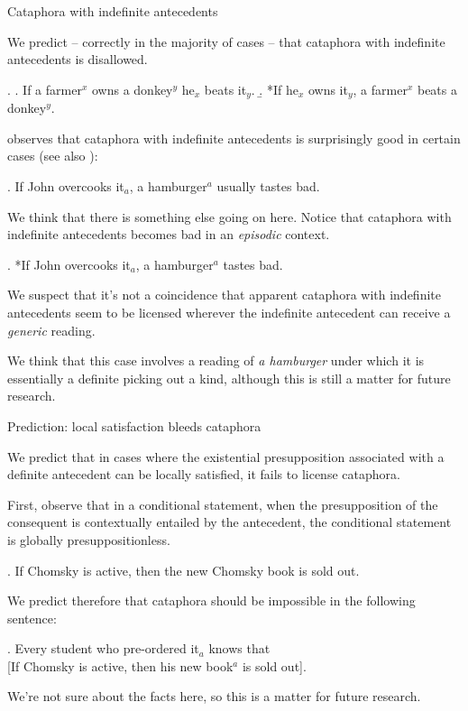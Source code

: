 \documentclass{beamer}
\begin{document}
\begin{frame}[allowframebreaks]{Cataphora with indefinite antecedents}

  We predict -- correctly in the majority of cases -- that cataphora with indefinite antecedents is disallowed.

  \exi.
  \a. If a farmer\(^{x}\) owns a donkey\(^{y}\) he\(_{x}\) beats it\(_{y}\).
  \b. *If he\(_{x}\) owns it\(_{y}\), a farmer\(^{x}\) beats a donkey\(^{y}\).

  \framebreak

  \citet[p.\,192]{chierchia_dynamics_1995} observes that cataphora with indefinite antecedents is surprisingly good in certain cases (see also \citealt{barkerShan2008}):

  \ex. If John overcooks it\(_{a}\), a hamburger\(^{a}\) usually tastes bad.

  \framebreak

  We think that there is something else going on here. Notice that cataphora with indefinite antecedents becomes bad in an \textit{episodic} context.

  \ex. *If John overcooks it\(_{a}\), a hamburger\(^{a}\) tastes bad.

  We suspect that it's not a coincidence that apparent cataphora with indefinite antecedents seem to be licensed wherever the indefinite antecedent can receive a \textit{generic} reading.

  We think that this case involves a reading of \textit{a hamburger} under which it is essentially a definite picking out a kind, although this is still a matter for future research.

\end{frame}

\begin{frame}[allowframebreaks]{Prediction: local satisfaction bleeds cataphora}

  We predict that in cases where the existential presupposition associated with a definite antecedent can be locally satisfied, it fails to license cataphora.

  First, observe that in a conditional statement, when the presupposition of the consequent is contextually entailed by the antecedent, the conditional statement is globally presuppositionless.

  \ex. If Chomsky is active, then the new Chomsky book is sold out.

  \framebreak

  We predict therefore that cataphora should be impossible in the following sentence:

  \ex. Every student who pre-ordered it\(_{a}\) knows that\\
  {[}If Chomsky is active, then his new book\(^{a}\) is sold out].

  We're not sure about the facts here, so this is a matter for future research.

\end{frame}
\end{document}
